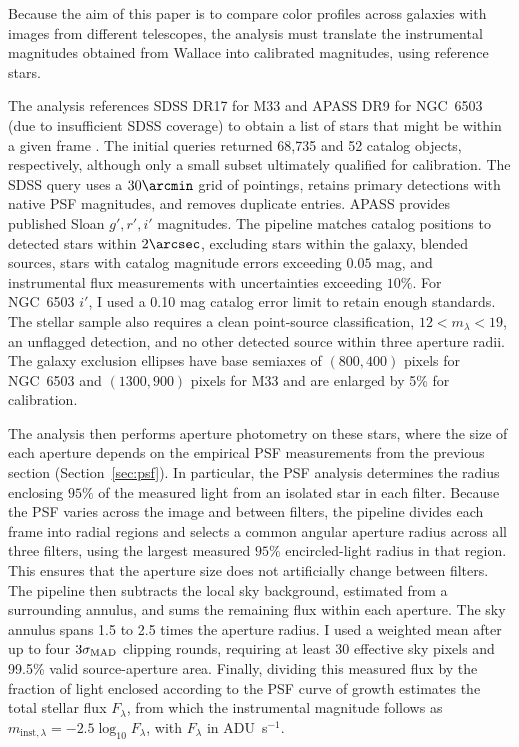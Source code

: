 Because the aim of this paper is to compare color profiles across galaxies with images from different telescopes, the analysis must translate the instrumental magnitudes obtained from Wallace into calibrated magnitudes, using reference stars.

The analysis references SDSS DR17 for M33 and APASS DR9 for NGC~6503 (due to insufficient SDSS coverage) to obtain a list of stars that might be within a given frame \citep{methDR17,methAPASS}. The initial queries returned 68,735 and 52 catalog objects, respectively, although only a small subset ultimately qualified for calibration. The SDSS query uses a $30\arcmin$ grid of pointings, retains primary detections with native PSF magnitudes, and removes duplicate entries. APASS provides published Sloan $g',r',i'$ magnitudes. The pipeline matches catalog positions to detected stars within $2\arcsec$, excluding stars within the galaxy, blended sources, stars with catalog magnitude errors exceeding $0.05$ mag, and instrumental flux measurements with uncertainties exceeding $10\%$. For NGC~6503 $i'$, I used a 0.10 mag catalog error limit to retain enough standards. The stellar sample also requires a clean point-source classification, $12<m_\lambda<19$, an unflagged detection, and no other detected source within three aperture radii. The galaxy exclusion ellipses have base semiaxes of $(800,400)$ pixels for NGC~6503 and $(1300,900)$ pixels for M33 and are enlarged by 5\% for calibration.

The analysis then performs aperture photometry on these stars, where the size of each aperture depends on the empirical PSF measurements from the previous section (Section~\ref{sec:psf}). In particular, the PSF analysis determines the radius enclosing $95\%$ of the measured light from an isolated star in each filter. Because the PSF varies across the image and between filters, the pipeline divides each frame into radial regions and selects a common angular aperture radius across all three filters, using the largest measured $95\%$ encircled-light radius in that region. This ensures that the aperture size does not artificially change between filters. The pipeline then subtracts the local sky background, estimated from a surrounding annulus, and sums the remaining flux within each aperture. The sky annulus spans 1.5 to 2.5 times the aperture radius. I used a weighted mean after up to four $3\sigma_{\rm MAD}$ clipping rounds, requiring at least 30 effective sky pixels and 99.5\% valid source-aperture area. Finally, dividing this measured flux by the fraction of light enclosed according to the PSF curve of growth estimates the total stellar flux $F_\lambda$, from which the instrumental magnitude follows as $m_{\mathrm{inst},\lambda}=-2.5\log_{10}F_\lambda$, with $F_\lambda$ in ADU~s$^{-1}$.

